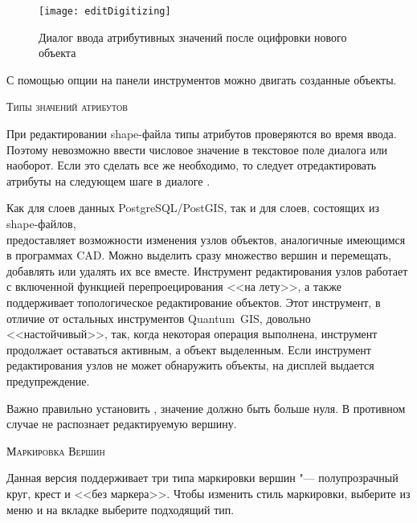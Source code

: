 \begin{figure}[ht]
   \centering
   \texttt{[image: editDigitizing]}
   \caption{Диалог ввода атрибутивных значений после оцифровки нового объекта \wincaption}\label{fig:vector_digitising}
 \end{figure}

С помощью опции  на
панели инструментов можно двигать созданные объекты.

\begin{Tip}\caption{\textsc{Типы значений атрибутов}}
При редактировании shape-файла типы атрибутов проверяются во время ввода.
Поэтому невозможно ввести числовое значение в текстовое поле диалога
 или наоборот. Если это сделать все же необходимо,
то следует отредактировать атрибуты на следующем шаге в диалоге
.
\end{Tip}


Как для слоев данных PostgreSQL/PostGIS, так и для слоев, состоящих из
shape-файлов, \\
 предоставляет
возможности изменения узлов объектов, аналогичные имеющимся в программах CAD.
Можно выделить сразу множество вершин и перемещать, добавлять или удалять
их все вместе. Инструмент редактирования узлов работает с включенной функцией
перепроецирования <<на лету>>, а также поддерживает топологическое редактирование
объектов. Этот инструмент, в отличие от остальных инструментов Quantum~GIS,
довольно <<настойчивый>>, так, когда некоторая операция выполнена, инструмент
продолжает оставаться активным, а объект выделенным. Если инструмент
редактирования узлов не может обнаружить объекты, на дисплей выдается
предупреждение.

Важно правильно установить  \arrow
{} \arrow
{} \arrow {}, значение должно быть
больше нуля. В противном случае \qg не распознает редактируемую вершину.

\begin{Tip}\caption{\textsc{Маркировка Вершин}}
Данная версия \qg поддерживает три типа маркировки вершин "--- полупрозрачный
круг, крест и <<без маркера>>. Чтобы изменить стиль маркировки, выберите
 из меню 
и на вкладке  выберите подходящий тип.
\end{Tip}

